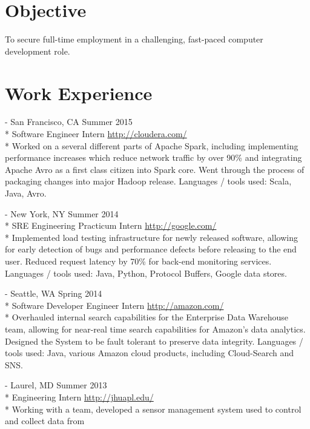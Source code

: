 \documentclass[a4paper,margin,line]{resume}
\newcommand{\rurl}[1]{\hfill {\footnotesize \url{#1}}}
\newcommand{\rdate}[1]{\hfill {\small #1}}
\renewcommand{\employer}[5]{ \item[#1] - #2 \rdate{#3} \\* #4 \rurl{#5} \\*}
\begin{document}
\begin{resume}
\section{\mysidestyle Objective}
    To secure full-time employment in a challenging, fast-paced computer development role.
\section{\mysidestyle Work Experience}
	\begin{asparadesc}
        \employer{Cloudera}{San Francisco, CA}{Summer 2015}{Software Engineer Intern}
        {http://cloudera.com/}
        \small
        Worked on a several different parts of Apache Spark, including implementing performance
        increases which reduce network traffic by over 90\% and integrating Apache
        Avro as a first class citizen into Spark core. Went through the process of packaging
        changes into major Hadoop release. Languages / tools used: 
        Scala, Java, Avro.
        \normalsize
        \\
        \employer{Google}{New York, NY}{Summer 2014}{SRE Engineering Practicum Intern}
        {http://google.com/}
		\small
        Implemented load testing infrastructure for newly released software,
        allowing for early detection of bugs and performance defects before
        releasing to the end user. Reduced request latency by 70\% for 
        back-end monitoring services. Languages / tools used: Java, Python, 
        Protocol Buffers, Google data stores.
		\normalsize
		\\
		\employer{Amazon}{Seattle, WA}{Spring 2014}{Software Developer Engineer Intern}
        {http://amazon.com/}
		\small
	    Overhauled internal search capabilities for the Enterprise Data Warehouse
        team, allowing for near-real time search capabilities for Amazon's data
        analytics. Designed the System to be fault tolerant to preserve data integrity.
        Languages / tools used: Java, various Amazon cloud products, including Cloud-Search
        and SNS.
        \normalsize
		\\
		\employer{John Hopkins University Applied Physics Lab}{Laurel, MD}
        {Summer 2013}{Engineering Intern}{http://jhuapl.edu/}
		\small
		Working with a team, developed a sensor management system used to control and collect data from

\end{asparadesc}
\end{resume}
\end{document}
